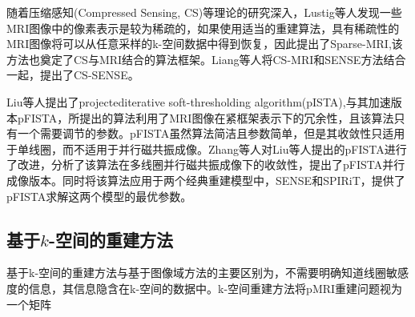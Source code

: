 \documentclass[lang=cn,11pt,a4paper,cite=numbers]{elegantpaper}
\begin{document}
\par 随着压缩感知(Compressed Sensing, CS)等理论的研究深入，Lustig等人发现一些MRI图像中的像素表示是较为稀疏的，如果使用适当的重建算法，具有稀疏性的MRI图像将可以从任意采样的k-空间数据中得到恢复，因此提出了Sparse-MRI\cite{lustig2007sparse},该方法也奠定了CS与MRI结合的算法框架。Liang等人将CS-MRI和SENSE方法结合一起，提出了CS-SENSE\cite{liang2009accelerating}。

\par Liu等人提出了projectediterative soft-thresholding algorithm(pISTA),与其加速版本pFISTA\cite{7448403}，所提出的算法利用了MRI图像在紧框架表示下的冗余性，且该算法只有一个需要调节的参数。pFISTA虽然算法简洁且参数简单，但是其收敛性只适用于单线圈，而不适用于并行磁共振成像。Zhang等人对Liu等人提出的pFISTA进行了改进，分析了该算法在多线圈并行磁共振成像下的收敛性，提出了pFISTA并行成像版本\cite{ZHANG2021101987}。同时将该算法应用于两个经典重建模型中，SENSE\cite{pruessmann1999sense}和SPIRiT\cite{lustig2010spirit}，提供了pFISTA求解这两个模型的最优参数。

\subsection{基于$k$-空间的重建方法} 
\par 基于k-空间的重建方法与基于图像域方法的主要区别为，不需要明确知道线圈敏感度的信息，其信息隐含在k-空间的数据中。k-空间重建方法将pMRI重建问题视为一个矩阵
\newpage


\end{document}

